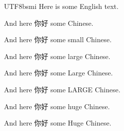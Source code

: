 \documentclass{article}
\newcommand{\myfont}{bsmi} %
\begin{document}
 
\begin{CJK}{UTF8}{\myfont} 
  Here is some English text.

  And here 你好 some Chinese.

    {\small And here 你好 some small Chinese. \par}
    {\large And here 你好 some large Chinese. \par}
    {\Large And here 你好 some Large Chinese. \par}
    {\LARGE And here 你好 some LARGE Chinese. \par}
    {\huge And here 你好 some huge Chinese. \par}
    {\Huge And here 你好 some Huge Chinese. \par}

\end{CJK} 
\end{document}
